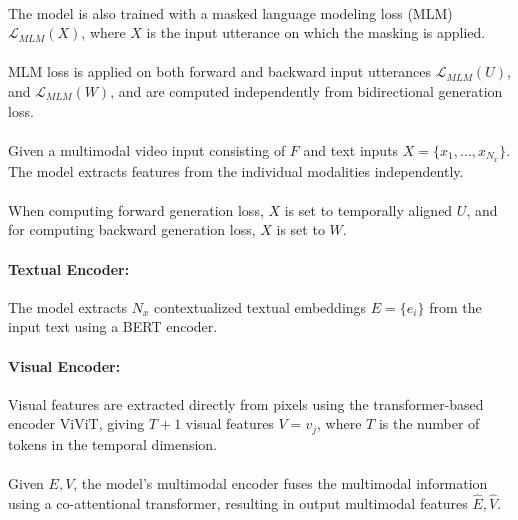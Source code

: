 \documentclass{article}
\begin{document}
\paragraph{}The model is also trained with a masked language modeling loss (MLM) 
$\mathcal{L}_{MLM}(X)$, where $X$ is the input utterance on which the masking is applied.

\paragraph{}MLM loss is applied on both forward and backward input utterances $\mathcal{L}_{MLM}(U)$, and 
$\mathcal{L}_{MLM}(W)$, and are computed independently from bidirectional generation loss.

\paragraph{}Given a multimodal video input consisting of $F$ and text inputs $X = \{x_1, \ldots, x_{N_x}\}$.
The model extracts features from the individual modalities independently.

\paragraph{}When computing forward generation loss, $X$ is set to temporally aligned $U$, and for 
computing backward generation loss, $X$ is set to $W$.

\paragraph{Textual Encoder:} The model extracts $N_x$ contextualized textual embeddings
$E = \{e_i\}$ from the input text using a BERT encoder.

\paragraph{Visual Encoder:} Visual features are extracted directly from pixels using the transformer-based
encoder ViViT, giving $T+1$ visual features $V = {v_j}$, where $T$ is the number of tokens in the
temporal dimension.

\paragraph{}Given $E, V$, the model's multimodal encoder fuses the multimodal information using
a co-attentional transformer, resulting in output multimodal features $\hat{E}, \hat{V}$.
\end{document}
